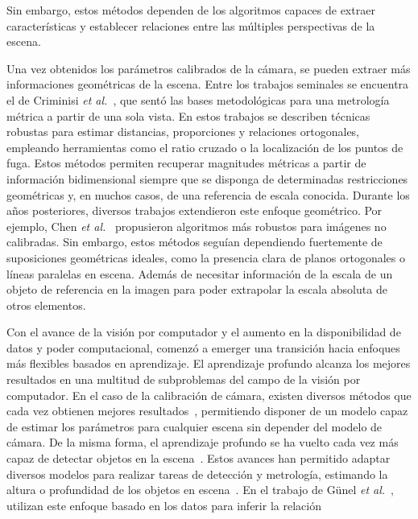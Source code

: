 Sin embargo, estos métodos dependen de los algoritmos capaces de extraer características y establecer relaciones
entre las múltiples perspectivas de la escena.
\par
Una vez obtenidos los parámetros calibrados de la cámara, se pueden extraer más informaciones geométricas de la escena.
Entre los trabajos seminales se encuentra el de Criminisi \emph{et al.}~\cite{CriminisiReconstruction,CriminisiApplications},
que sentó las bases metodológicas para una metrología métrica a partir de una sola vista. En estos trabajos
se describen técnicas robustas para estimar distancias, proporciones y relaciones ortogonales, empleando herramientas como el
ratio cruzado o la localización de los puntos de fuga.
Estos métodos permiten recuperar magnitudes métricas a partir de información bidimensional siempre que se disponga de
determinadas restricciones geométricas y, en muchos casos, de una referencia de escala conocida.
Durante los años posteriores, diversos trabajos extendieron este enfoque geométrico. Por ejemplo, Chen \emph{et al.}~\cite{Chen2006}
propusieron algoritmos más robustos para imágenes no calibradas. Sin embargo, estos métodos seguían dependiendo fuertemente de
suposiciones geométricas ideales, como la presencia clara de planos ortogonales o líneas paralelas en escena. Además de necesitar
información de la escala de un objeto de referencia en la imagen para poder extrapolar la escala absoluta de otros elementos.
\par
Con el avance de la visión por computador y el aumento en la disponibilidad de datos y poder computacional, comenzó a emerger una
transición hacia enfoques más flexibles basados en aprendizaje. El aprendizaje profundo alcanza los mejores resultados en una
multitud de subproblemas del campo de la visión por computador. En el caso de la calibración de cámara, existen diversos métodos
que cada vez obtienen mejores resultados~\cite{CalibDataGeneration,SPEC,DeepCalib, SVMIW}, permitiendo disponer de un modelo capaz de estimar los parámetros para cualquier escena
sin depender del modelo de cámara. De la misma forma, el aprendizaje profundo se ha vuelto cada vez más capaz de detectar objetos
en la escena~\cite{ObjectDetectionSurvey}. Estos avances han permitido adaptar diversos modelos para realizar tareas de detección y metrología,
estimando la altura o profundidad de los objetos en escena~\cite{SVMIW, SPEC, yang2024depthv2, DepthMapMultiScale}.
En el trabajo de Günel \emph{et al.}~\cite{günel2018facebodyshapestell}, utilizan este enfoque basado en los datos para inferir la relación

